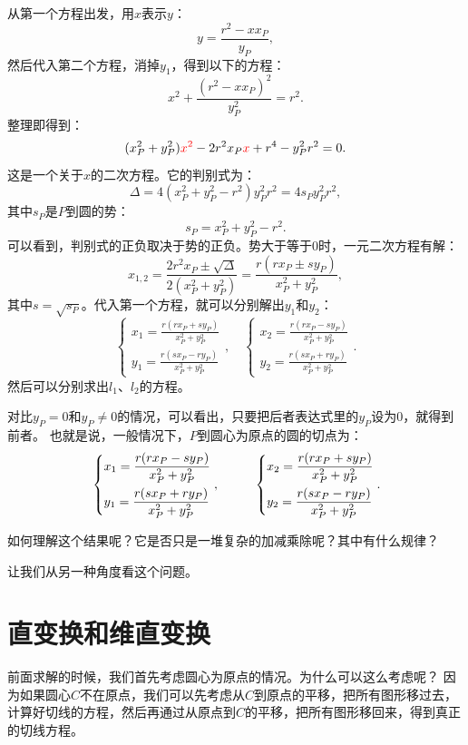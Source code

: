 \documentclass[12pt,UTF8,fontset=none]{ctexbook}
\begin{document}
从第一个方程出发，用$x$表示$y$：
$$ y = \frac{r^2 - xx_P}{y_P},$$
然后代入第二个方程，消掉$y_1$，得到以下的方程：
$$ x^2 + \frac{(r^2 - xx_P)^2}{y_P^2} = r^2.$$
整理即得到：
$$ (x_P^2+y_P^2){\color{red}x^2} - 2r^2x_P{\color{red}x} + r^4 - y_P^2r^2 = 0.$$
这是一个关于$x$的二次方程。它的判别式为：
$$\Delta = 4(x_P^2+y_P^2 - r^2)y_P^2r^2 = 4s_Py_P^2r^2,$$
其中$s_P$是$P$到圆的势：
$$ s_P = x_P^2+y_P^2 - r^2. $$
可以看到，判别式的正负取决于势的正负。势大于等于$0$时，一元二次方程有解：
$$x_{1,2} = \frac{2r^2x_P \pm \sqrt{\Delta} }{2(x_P^2+y_P^2)} =  \frac{r(rx_P \pm sy_P) }{x_P^2+y_P^2}, $$
其中$s = \sqrt{s_P}$。代入第一个方程，就可以分别解出$y_1$和$y_2$：
$$
    \left\{ \begin{array}{rrc}
        x_1 =\displaystyle \frac{r(rx_P + sy_P) }{x_P^2+y_P^2} \\
        y_1 =\displaystyle  \frac{r(sx_P - ry_P)}{x_P^2+y_P^2}
    \end{array}\right., 
    \quad
    \left\{ \begin{array}{rrc}
        x_2 =\displaystyle  \frac{r(rx_P - sy_P) }{x_P^2+y_P^2} \\
        y_2 =\displaystyle  \frac{r(sx_P + ry_P)}{x_P^2+y_P^2}
    \end{array}\right..
$$
然后可以分别求出$l_1$、$l_2$的方程。

对比$y_P=0$和$y_P\neq 0$的情况，可以看出，只要把后者表达式里的$y_P$设为$0$，就得到前者。
也就是说，一般情况下，$P$到圆心为原点的圆的切点为：
\begin{alignat*}{2}
    &   \begin{dcases}
        x_1 = \frac{r(rx_P - sy_P) }{x_P^2+y_P^2} \\
        y_1 = \frac{r(sx_P + ry_P)}{x_P^2+y_P^2}
      \end{dcases}
    ,& \quad\quad
      \begin{dcases}
        x_2 = \frac{r(rx_P + sy_P) }{x_P^2+y_P^2} \\
        y_2 = \frac{r(sx_P - ry_P)}{x_P^2+y_P^2}
      \end{dcases}
    .
\end{alignat*}

如何理解这个结果呢？它是否只是一堆复杂的加减乘除呢？其中有什么规律？

让我们从另一种角度看这个问题。

\section{直变换和维直变换}
前面求解的时候，我们首先考虑圆心为原点的情况。为什么可以这么考虑呢？
因为如果圆心$C$不在原点，我们可以先考虑从$C$到原点的平移，把所有图形移过去，
计算好切线的方程，然后再通过从原点到$C$的平移，把所有图形移回来，得到真正的切线方程。
\end{document}
